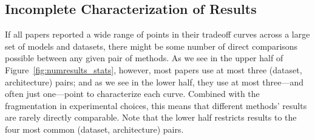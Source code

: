 \subsection{Incomplete Characterization of Results}


If all papers reported a wide range of points in their tradeoff curves across a large set of models and datasets, there might be some number of direct comparisons possible between any given pair of methods. %
As we see in the upper half of Figure~\ref{fig:numresults_stats}, however, most papers use at most three (dataset, architecture) pairs; and as we see in the lower half, they use at most three---and often just one---point to characterize each curve. Combined with the fragmentation in experimental choices, this means that different methods' results are rarely directly comparable. Note that the lower half restricts results to the four most common (dataset, architecture) pairs.

